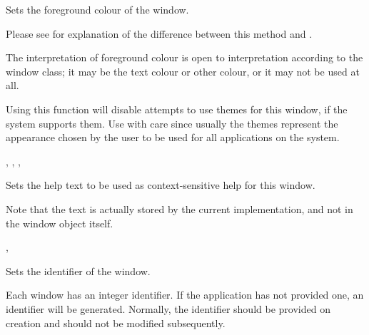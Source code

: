 Sets the foreground colour of the window.

Please see  for
explanation of the difference between this method and
.




The interpretation of foreground colour is open to interpretation according
to the window class; it may be the text colour or other colour, or it may not
be used at all.

Using this function will disable attempts to use themes for this
window, if the system supports them.  Use with care since usually the
themes represent the appearance chosen by the user to be used for all
applications on the system.


,\rtfsp
{},\rtfsp
{},\rtfsp
{}


\label{wxwindowsethelptext}


Sets the help text to be used as context-sensitive help for this window.

Note that the text is actually stored by the current  implementation,
and not in the window object itself.


, 


\label{wxwindowsetid}


Sets the identifier of the window.


Each window has an integer identifier. If the application has not provided one,
an identifier will be generated. Normally, the identifier should be provided
on creation and should not be modified subsequently.

